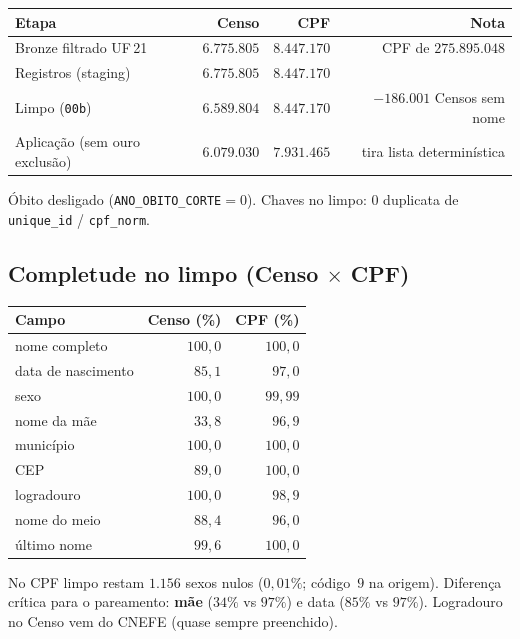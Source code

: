 \documentclass[11pt,a4paper]{article}
\begin{document}
\begin{center}
\begin{tabular}{@{}lrrr@{}}
\toprule
Etapa & Censo & CPF & Nota \\
\midrule
Bronze filtrado UF\,21 & $6{.}775{.}805$ & $8{.}447{.}170$ &
  CPF de $275{.}895{.}048$ \\
Registros (staging) & $6{.}775{.}805$ & $8{.}447{.}170$ & \\
Limpo (\texttt{00b}) & $6{.}589{.}804$ & $8{.}447{.}170$ &
  $-186{.}001$ Censos sem nome \\
Aplicação (sem ouro exclusão) & $6{.}079{.}030$ & $7{.}931{.}465$ &
  tira lista determinística \\
\bottomrule
\end{tabular}
\end{center}

Óbito desligado (\texttt{ANO\_OBITO\_CORTE}$=0$). Chaves no limpo: $0$
duplicata de \texttt{unique\_id} / \texttt{cpf\_norm}.

\subsection{Completude no limpo (Censo $\times$ CPF)}

\begin{center}
\small
\begin{tabular}{@{}lrr@{}}
\toprule
Campo & Censo (\%) & CPF (\%) \\
\midrule
nome completo & $100{,}0$ & $100{,}0$ \\
data de nascimento & $85{,}1$ & $97{,}0$ \\
sexo & $100{,}0$ & $99{,}99$ \\
nome da mãe & $33{,}8$ & $96{,}9$ \\
município & $100{,}0$ & $100{,}0$ \\
CEP & $89{,}0$ & $100{,}0$ \\
logradouro & $100{,}0$ & $98{,}9$ \\
nome do meio & $88{,}4$ & $96{,}0$ \\
último nome & $99{,}6$ & $100{,}0$ \\
\bottomrule
\end{tabular}
\end{center}

No CPF limpo restam $1{.}156$ sexos nulos ($0{,}01\%$; código~$9$ na origem).
Diferença crítica para o pareamento: \textbf{mãe} ($34\%$ vs $97\%$) e data
($85\%$ vs $97\%$). Logradouro no Censo vem do CNEFE (quase sempre preenchido).
\end{document}
